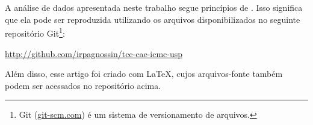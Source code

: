 \section{}
\label{ap:rr}

A análise de dados apresentada neste trabalho segue princípios de  \cite{Peng2011}. Isso significa que ela pode ser reproduzida utilizando os arquivos disponibilizados no seguinte repositório Git\footnote{Git (\url{git-scm.com}) é um sistema de versionamento de arquivos.}:

\begin{center}
	\url{http://github.com/irpagnossin/tcc-cae-icmc-usp}
\end{center}

Além disso, esse artigo foi criado com \LaTeX, cujos arquivos-fonte também podem ser acessados no repositório acima.
